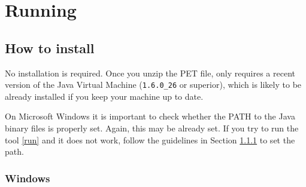 \chapter{Running}

\section{How to install}

No installation is required. Once you unzip the PET file, \PET only requires a recent version of the Java Virtual Machine (\verb!1.6.0_26! or superior), which is likely to be already installed if you keep your machine up to date. 

On Microsoft Windows it is important to check whether the PATH to the Java binary files is properly set. Again, this may be already set. If you try to run the tool \ref{run} and it does not work, follow the guidelines in Section \ref{sec:win} to set the path.

\subsection{Windows}\label{sec:win}

